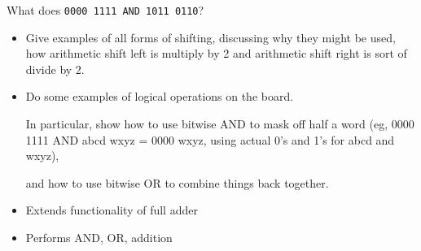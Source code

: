 \begin{frame}[fragile]
\begin{tcolorbox}[enhanced,attach boxed title to top center={yshift=-3mm,yshifttext=-1mm},
  colback=blue!5!white,colframe=blue!75!black,colbacktitle=blue!80!black,
  title=Think About It,fonttitle=\bfseries,
  boxed title style={size=small,colframe=red!50!black} ]
What does \texttt{0000 1111 AND 1011 0110}?\\ \ifnum{}\fi
  \end{tcolorbox}



\BNotes\ifnum{}
\begin{itemize}
\item Give examples of all forms of shifting, discussing why they might be
	used, how arithmetic shift left is multiply by 2 and arithmetic
	shift right is sort of divide by 2.
	
\item Do some examples of logical operations on the board.  

	In particular, show how to use
	bitwise AND to mask off half a word 
	(eg, 0000 1111 AND abcd wxyz = 0000 wxyz, using actual 0's and 1's
	for abcd and wxyz),

	and how to use bitwise OR to combine things back together.
\end{itemize}
\fi\ENotes
\end{frame}



\begin{frame}[fragile]
\begin{itemize}
\item Extends functionality of full adder
\item Performs AND, OR, addition
\end{itemize}
\BNotes\ifnum{}
~%
\fi\ENotes
\end{frame}

